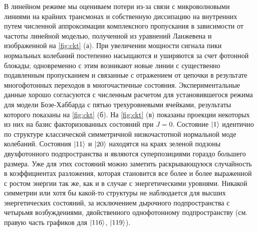 \documentclass[14pt, a4paper]{extarticle}
\DeclarePairedDelimiter\ket{\lvert}{\rangle}
\begin{document}
В линейном режиме мы оцениваем потери из-за связи с микроволновыми линиями на крайних трансмонах и собственную диссипацию на внутренних путем численной аппроксимации комплексного пропускания в зависимости от частоты линейной моделью, полученной из уравнений Ланжевена и изображенной на \autoref{fig:ckt} (а). При увеличении мощности сигнала пики нормальных колебаний постепенно насыщаются и уширяются за счет фотонной блокады; одновременно с этим возникают новые линии с существенно подавленным пропусканием и связанные с отражением от цепочки в результате многофотонных переходов в многочастичные состояния. Экспериментальные данные хорошо согласуются с численным расчетом для установившегося режима для модели Бозе-Хаббарда с пятью трехуровневыми ячейками, результаты которого показаны на \autoref{fig:ckt} (б). На \autoref{fig:ckt} (в) показаны проекции некоторых из них на базис факторизованных состояний при $J=0$. Состояние $\ket{1}$ идентично по структуре классической симметричной низкочастотной нормальной моде колебаний. Состояния $\ket{11}$ и $\ket{20}$ находятся на краях зеленой подзоны двухфотонного подпространства и являются суперпозициями гораздо большего размера. Уже для этих состояний можно заметить раскрывающуюся случайность в коэффициентах разложения, которая становится все более и более выраженной с ростом энергии так же, как и в случае с энергетическими уровнями. Никакой симметрии или хотя бы какой-то структуры не наблюдается для высших энергетических состояний, за исключением дырочного подпространства с четырьмя возбуждениями, двойственного однофотонному подпространству (см. правую часть графиков для $\ket{116}$, $\ket{119}$).
\end{document}
